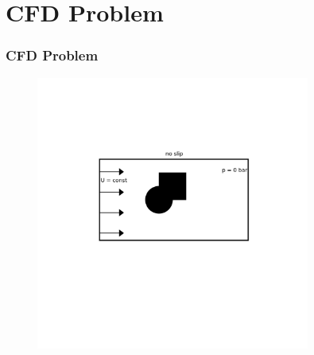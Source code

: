 \documentclass{beamer}
\begin{document}
\section{CFD Problem} %
\begin{frame}
\frametitle{CFD Problem}
\begin{figure}[h]
\includegraphics[width=9cm, trim = 3.9cm 6cm 3.5cm 4.5cm, clip]{img/BCs.png}
\end{figure}
\end{frame}
\end{document}
